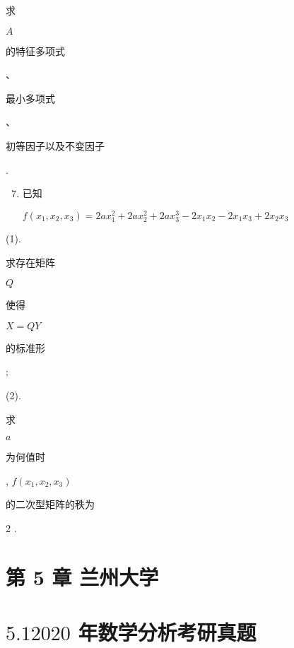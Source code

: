 \documentclass[10pt]{article}
\begin{document}
\begin{CJK}{UTF8}{mj}求\end{CJK} $A$ \begin{CJK}{UTF8}{mj}的特征多项式\end{CJK}、\begin{CJK}{UTF8}{mj}最小多项式\end{CJK}、\begin{CJK}{UTF8}{mj}初等因子以及不变因子\end{CJK}.

\begin{enumerate}
  \setcounter{enumi}{6}
  \item \begin{CJK}{UTF8}{mj}已知\end{CJK} $f\left(x_{1}, x_{2}, x_{3}\right)=2 a x_{1}^{2}+2 a x_{2}^{2}+2 a x_{3}^{3}-2 x_{1} x_{2}-2 x_{1} x_{3}+2 x_{2} x_{3}$
\end{enumerate}
(1). \begin{CJK}{UTF8}{mj}求存在矩阵\end{CJK} $Q$ \begin{CJK}{UTF8}{mj}使得\end{CJK} $X=Q Y$ \begin{CJK}{UTF8}{mj}的标准形\end{CJK};

(2). \begin{CJK}{UTF8}{mj}求\end{CJK} $a$ \begin{CJK}{UTF8}{mj}为何值时\end{CJK}, $f\left(x_{1}, x_{2}, x_{3}\right)$ \begin{CJK}{UTF8}{mj}的二次型矩阵的秩为\end{CJK} 2 .

\section{第 5 章 兰州大学}
\section{$5.12020$ 年数学分析考研真题}
\end{document}
